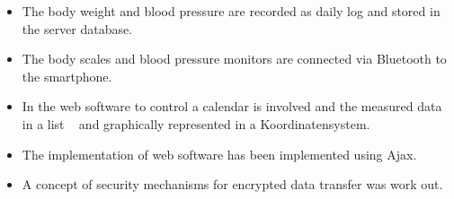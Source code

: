 \begin{itemize}
 \item The body weight and blood pressure are recorded as daily log and stored in the server database.
 \item The body scales and blood pressure monitors are connected via Bluetooth to the smartphone.
 \item In the web software to control a calendar is involved and the measured data in a list
  and graphically represented in a Koordinatensystem.
 \item The implementation of web software has been implemented using Ajax.
 \item A concept of security mechanisms for encrypted data transfer was work out.
\end{itemize}